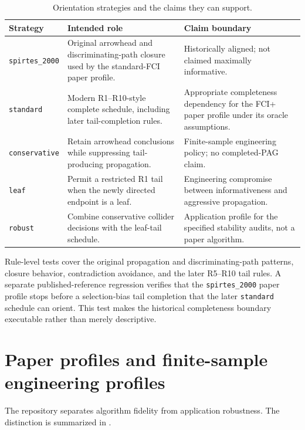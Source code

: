 \documentclass[11pt,a4paper,oneside]{report}
\newcommand{\code}[1]{\texttt{#1}}
\begin{document}
\begin{table}[H]
\centering
\caption{Orientation strategies and the claims they can support.}
\label{tab:orientation-strategies}
\begin{tabularx}{\textwidth}{p{}p{}Y}
\toprule
Strategy & Intended role & Claim boundary \\
\midrule
\code{spirtes\_2000} &
Original arrowhead and discriminating-path closure used by the standard-FCI
paper profile. &
Historically aligned; not claimed maximally informative. \\
\code{standard} &
Modern R1--R10-style complete schedule, including later tail-completion
rules. &
Appropriate completeness dependency for the FCI+ paper profile under its
oracle assumptions. \\
\code{conservative} &
Retain arrowhead conclusions while suppressing tail-producing propagation. &
Finite-sample engineering policy; no completed-PAG claim. \\
\code{leaf} &
Permit a restricted R1 tail when the newly directed endpoint is a leaf. &
Engineering compromise between informativeness and aggressive propagation. \\
\code{robust} &
Combine conservative collider decisions with the leaf-tail schedule. &
Application profile for the specified stability audits, not a paper
algorithm. \\
\bottomrule
\end{tabularx}
\end{table}

Rule-level tests cover the original propagation and discriminating-path
patterns, closure behavior, contradiction avoidance, and the later R5--R10
tail rules.  A separate published-reference regression verifies that the
\code{spirtes\_2000} paper profile stops before a selection-bias tail
completion that the later \code{standard} schedule can orient.  This test
makes the historical completeness boundary executable rather than merely
descriptive.

\section{Paper profiles and finite-sample engineering profiles}
\label{sec:paper-versus-engineering}

The repository separates algorithm fidelity from application robustness.
The distinction is summarized in .
\end{document}
